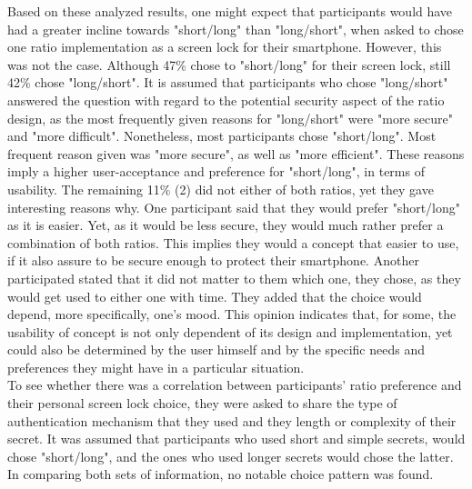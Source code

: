 Based on these analyzed results, one might expect that participants would have had a greater incline towards "short/long" than "long/short", when asked to chose one ratio implementation as a screen lock for their smartphone. However, this was not the case. Although 47\% chose to "short/long" for their screen lock, still 42\% chose "long/short". It is assumed that participants who chose "long/short" answered the question with regard to the potential security aspect of the ratio design, as the most frequently given reasons for "long/short" were "more secure" and "more difficult". Nonetheless, most participants chose "short/long". Most frequent reason given was "more secure", as well as "more efficient". These reasons imply a higher user-acceptance and preference for "short/long", in terms of usability. The remaining 11\% (2) did not either of both ratios, yet they gave interesting reasons why. One participant said that they would prefer "short/long" as it is easier. Yet, as it would be less secure, they would much rather prefer a combination of both ratios. This implies they would a concept that easier to use, if it also assure to be secure enough to protect their smartphone. Another participated stated that it did not matter to them which one, they chose, as they would get used to either one with time. They added that the choice would depend, more specifically, one's mood. This opinion indicates that, for some, the usability of concept is not only dependent of its design and implementation, yet could also be determined by the user himself and by the specific needs and preferences they might have in a particular situation. \\

To see whether there was a correlation between participants' ratio preference and their personal screen lock choice, they were asked to share the type of authentication mechanism that they used and they length or complexity of their secret. It was assumed that participants who used short and simple secrets, would chose "short/long", and the ones who used longer secrets would chose the latter. In comparing both sets of information, no notable choice pattern was found. \\

